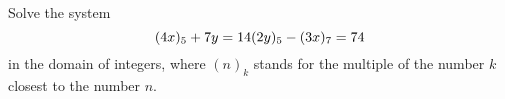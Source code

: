 Solve the system
\[(4x)_5+7y=14 \\ (2y)_5 -(3x)_7=74\]
in the domain of integers, where $(n)_k$ stands for the multiple of the number $k$ closest to the number $n$.